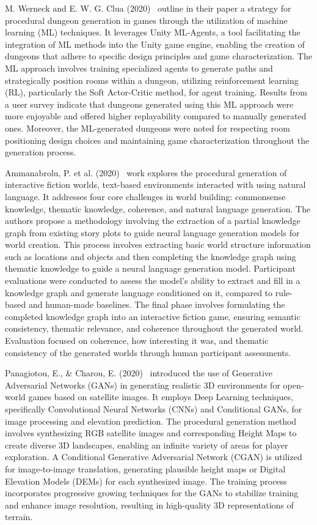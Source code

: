 \documentclass[runningheads]{llncs}
\begin{document}
M. Werneck and E. W. G. Clua (2020)~\cite{ref_article21} outline in their paper a strategy for procedural dungeon generation in games through the utilization of machine learning (ML) techniques. It leverages Unity ML-Agents, a tool facilitating the integration of ML methods into the Unity game engine, enabling the creation of dungeons that adhere to specific design principles and game characterization. The ML approach involves training specialized agents to generate paths and strategically position rooms within a dungeon, utilizing reinforcement learning (RL), particularly the Soft Actor-Critic method, for agent training. Results from a user survey indicate that dungeons generated using this ML approach were more enjoyable and offered higher replayability compared to manually generated ones. Moreover, the ML-generated dungeons were noted for respecting room positioning design choices and maintaining game characterization throughout the generation process.

Ammanabrolu, P. et al. (2020)~\cite{ref_article22} work explores the procedural generation of interactive fiction worlds, text-based environments interacted with using natural language. It addresses four core challenges in world building: commonsense knowledge, thematic knowledge, coherence, and natural language generation. The authors propose a methodology involving the extraction of a partial knowledge graph from existing story plots to guide neural language generation models for world creation. This process involves extracting basic world structure information such as locations and objects and then completing the knowledge graph using thematic knowledge to guide a neural language generation model. Participant evaluations were conducted to assess the model's ability to extract and fill in a knowledge graph and generate language conditioned on it, compared to rule-based and human-made baselines. The final phase involves formulating the completed knowledge graph into an interactive fiction game, ensuring semantic consistency, thematic relevance, and coherence throughout the generated world. Evaluation focused on coherence, how interesting it was, and thematic consistency of the generated worlds through human participant assessments.

Panagiotou, E., \& Charou, E. (2020)~\cite{ref_article23} introduced the use of Generative Adversarial Networks (GANs) in generating realistic 3D environments for open-world games based on satellite images. It employs Deep Learning techniques, specifically Convolutional Neural Networks (CNNs) and Conditional GANs, for image processing and elevation prediction. The procedural generation method involves synthesizing RGB satellite images and corresponding Height Maps to create diverse 3D landscapes, enabling an infinite variety of areas for player exploration. A Conditional Generative Adversarial Network (CGAN) is utilized for image-to-image translation, generating plausible height maps or Digital Elevation Models (DEMs) for each synthesized image. The training process incorporates progressive growing techniques for the GANs to stabilize training and enhance image resolution, resulting in high-quality 3D representations of terrain.
\end{document}
